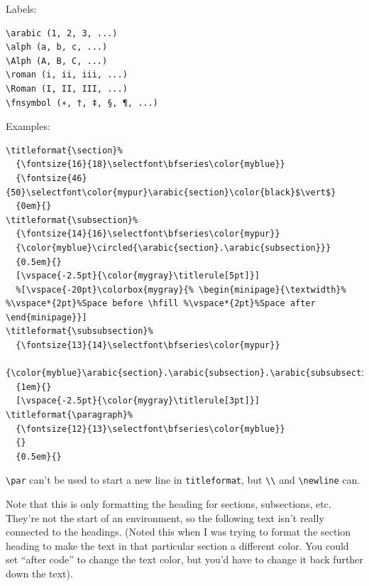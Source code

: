 \documentclass{article}
\begin{document}
Labels:
\begin{lstlisting}
\arabic (1, 2, 3, ...)
\alph (a, b, c, ...)
\Alph (A, B, C, ...)
\roman (i, ii, iii, ...)
\Roman (I, II, III, ...)
\fnsymbol (∗, †, ‡, §, ¶, ...)
\end{lstlisting}
Examples:
\begin{lstlisting}
\titleformat{\section}%
  {\fontsize{16}{18}\selectfont\bfseries\color{myblue}}
  {\fontsize{46}{50}\selectfont\color{mypur}\arabic{section}\color{black}$\vert$}
  {0em}{}
\titleformat{\subsection}%
  {\fontsize{14}{16}\selectfont\bfseries\color{mypur}}
  {\color{myblue}\circled{\arabic{section}.\arabic{subsection}}}
  {0.5em}{}
  [\vspace{-2.5pt}{\color{mygray}\titlerule[5pt]}]
  %[\vspace{-20pt}\colorbox{mygray}{% \begin{minipage}{\textwidth}% %\vspace*{2pt}%Space before \hfill %\vspace*{2pt}%Space after \end{minipage}}]
\titleformat{\subsubsection}%
  {\fontsize{13}{14}\selectfont\bfseries\color{mypur}}
  {\color{myblue}\arabic{section}.\arabic{subsection}.\arabic{subsubsection}}
  {1em}{}
  [\vspace{-2.5pt}{\color{mygray}\titlerule[3pt]}]
\titleformat{\paragraph}%
  {\fontsize{12}{13}\selectfont\bfseries\color{myblue}}
  {}
  {0.5em}{}
\end{lstlisting}
\verb|\par| can't be used to start a new line in \verb|titleformat|, but
\verb|\\| and
\verb|\newline| can.


Note that this is only formatting the heading for sections, subsections, etc.
They're not the start of an environment, so the following text isn't really
connected to the headings. (Noted this when I was trying to format the section
heading to make the text in that particular section a different color. You could
set ``after code'' to change the text color, but you'd have to change it back
further down the text).
\end{document}
